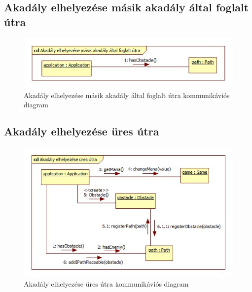 \subsection{Akadály elhelyezése másik akadály által foglalt útra}
\begin{figure}[H]
\begin{center}
\includegraphics[width=17cm]{chapters/chapter05/images/cd_Akadaly_elhelyezese_masik_akadaly_altal_foglalt_utra.jpg}
\caption{Akadály elhelyezése másik akadály által foglalt útra kommunikáviós diagram}
\label{fig:cd_Akadaly_elhelyezese_masik_akadaly_altal_foglalt_utra}
\end{center}
\end{figure}

\subsection{Akadály elhelyezése üres útra}
\begin{figure}[H]
\begin{center}
\includegraphics[width=17cm]{chapters/chapter05/images/cd_Akadaly_elhelyezese_ures_utra.jpg}
\caption{Akadály elhelyezése üres útra kommunikáviós diagram}
\label{fig:cd_Akadaly_elhelyezese_ures_utra}
\end{center}
\end{figure}

